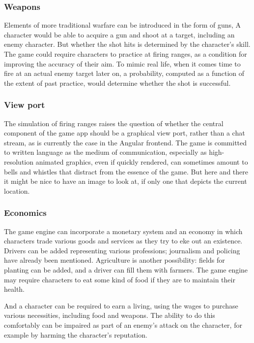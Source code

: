 \subsubsection{Weapons}

Elements of more traditional warfare can be introduced in the form of guns,
\etc\@
A character would be able to acquire a gun and shoot at a target, including
an enemy character.
But whether the shot hits is determined by the character's skill.
The game could require characters to practice at firing
ranges, as a condition for improving the accuracy of their aim.
To mimic real life, when it comes time to fire at an actual enemy target later
on, a probability, computed as a function of the extent of past practice, would
determine whether the shot is successful.

\subsubsection{View port}

The simulation of firing ranges raises the question of whether the central
component of the game app should be a graphical view port, rather than a
chat stream, as is currently the case in the Angular frontend.
The game is committed to written language as the medium of communication,
especially as high-resolution animated graphics, even if quickly
rendered, can sometimes amount to bells and whistles that distract from the
essence of the game.
But here and there it might be nice to have an image to look at, if only one
that depicts the current location.

\subsubsection{Economics}

The game engine can incorporate a monetary system and an economy in which
characters trade various goods and services as they try to eke out
an existence.
Drivers can be added representing various professions;
journalism and policing have already been mentioned.
Agriculture is another possibility: fields for planting can be added,
and a driver can fill them with farmers.
The game engine may require characters to eat some kind of food if they are
to maintain their health.

And a character can be required to earn a living, using the wages to
purchase various necessities, including food and weapons.
The ability to do this comfortably can be impaired as part of an enemy's attack
on the character, for example by harming the character's reputation.
